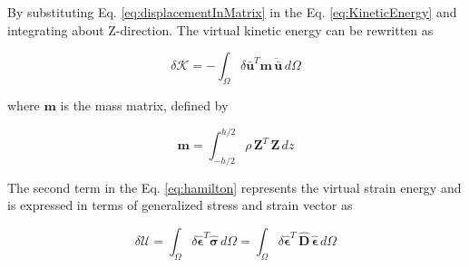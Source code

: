 \documentclass[3p,preprint,12pt]{elsarticle}
\begin{document}
By substituting Eq. \cref{eq:displacementInMatrix} in the Eq. \cref{eq:KineticEnergy} and integrating about Z-direction.  The virtual kinetic energy can be rewritten as

\begin{equation} \label{eq:VirtualKineticEnergy}
\delta \mathcal{K} =
-\int_{\Omega}\delta \boldsymbol{\bar{u}}^{T} \boldsymbol{m} \, \boldsymbol{\ddot{\bar{u}}} \,d\Omega
\end{equation}

where $\boldsymbol{m} $ is the mass matrix, defined by

\begin{equation*}
\boldsymbol{m} = \int^{h/2}_{-h/2} \rho \, \boldsymbol{Z}^{T} \, \boldsymbol{Z} \, dz
\end{equation*}

The second term in the Eq. \cref{eq:hamilton} represents the virtual strain energy and is expressed in terms of generalized stress and strain vector as


\begin{equation} \label{eq:VirtualStrainEnergy}
\delta\mathcal{U}=\int_{\Omega}\delta \boldsymbol{\hat{\epsilon}}^{T}  \boldsymbol{\hat{\sigma}} \, d\Omega=\int_{\Omega}\delta \boldsymbol{\hat{\epsilon}}^T \, \boldsymbol{\hat{D}} \, \boldsymbol{\hat{\epsilon}} \, d \Omega
\end{equation}
\end{document}
